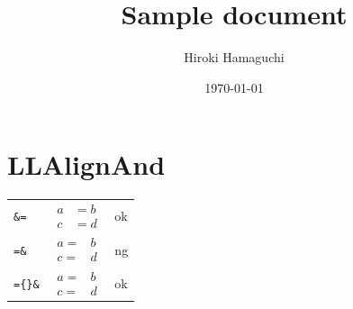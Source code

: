 \documentclass[a4paper]{article}
\newcommand{\tA}[1]{\textcolor{cA}{#1}}
\newcommand{\tD}[1]{\textcolor{cD}{#1}}
\begin{document}
\title{Sample document}
\author{Hiroki Hamaguchi}
\date{\today}
\maketitle

\section{LLAlignAnd}

\begin{table}[H]
	\centering
	\begin{tabular}{lll}
		\verb|&=|        &
		$\begin{aligned}
				 a & = b \\
				 c & = d
			 \end{aligned}$ &
		\tA{ok}            \\[0.3cm]
		\verb|=&|        &
		$\begin{aligned}
				 a = & b \\
				 c = & d
			 \end{aligned}$ &
		\tD{ng}            \\[0.3cm]
		\verb|={}&|      &
		$\begin{aligned}
				 a = {} & b \\
				 c = {} & d
			 \end{aligned}$ &
		\tA{ok}
	\end{tabular}
\end{table}
\end{document}
